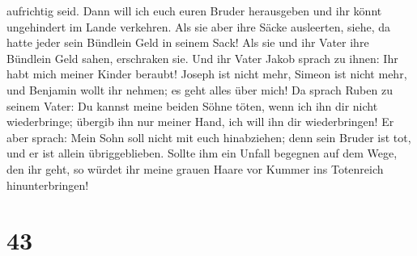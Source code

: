 aufrichtig seid. Dann will ich euch euren Bruder herausgeben und ihr
könnt ungehindert im Lande verkehren.  Als sie aber ihre
Säcke ausleerten, siehe, da hatte jeder sein Bündlein Geld in seinem
Sack! Als sie und ihr Vater ihre Bündlein Geld sahen, erschraken sie.
 Und ihr Vater Jakob sprach zu ihnen: Ihr habt mich
meiner Kinder beraubt! Joseph ist nicht mehr, Simeon ist nicht mehr, und
Benjamin wollt ihr nehmen; es geht alles über mich!  Da
sprach Ruben zu seinem Vater: Du kannst meine beiden Söhne töten, wenn
ich ihn dir nicht wiederbringe; übergib ihn nur meiner Hand, ich will
ihn dir wiederbringen!  Er aber sprach: Mein Sohn soll
nicht mit euch hinabziehen; denn sein Bruder ist tot, und er ist allein
übriggeblieben. Sollte ihm ein Unfall begegnen auf dem Wege, den ihr
geht, so würdet ihr meine grauen Haare vor Kummer ins Totenreich
hinunterbringen!

\hypertarget{section-42}{%
\section{43}\label{section-42}}

